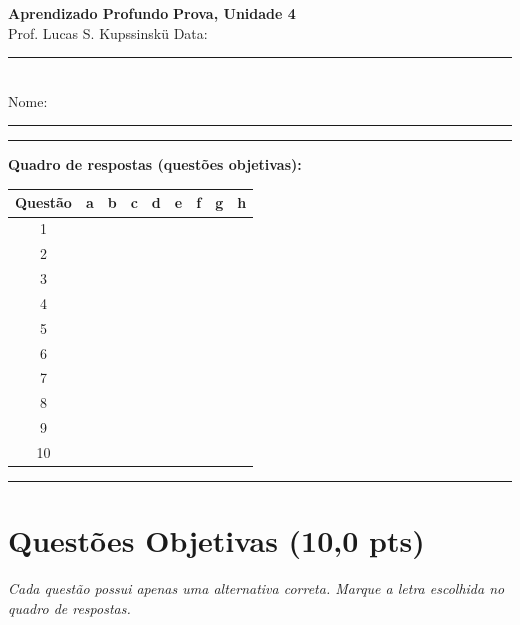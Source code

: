 \documentclass[11pt,a4paper]{article}
\begin{document}
{\Large\bfseries Aprendizado Profundo} \hfill \textbf{Prova, Unidade 4}\\
Prof. Lucas S. Kupssinskü \hfill Data: \rule{3cm}{0.4pt}\\[0.4em]
Nome: \rule{12cm}{0.4pt}

\rule{\linewidth}{0.8pt}

\textbf{Quadro de respostas (questões objetivas):}\\[0.3em]
\begin{center}
\begin{tabular}{|c|c|c|c|c|c|c|c|c|}
\hline
\textbf{Questão} & \textbf{a} & \textbf{b} & \textbf{c} & \textbf{d} & \textbf{e} & \textbf{f} & \textbf{g} & \textbf{h} \\\hline
1  & & & & & & & & \\\hline
2  & & & & & & & & \\\hline
3  & & & & & & & & \\\hline
4  & & & & & & & & \\\hline
5  & & & & & & & & \\\hline
6  & & & & & & & & \\\hline
7  & & & & & & & & \\\hline
8  & & & & & & & & \\\hline
9  & & & & & & & & \\\hline
10 & & & & & & & & \\\hline
\end{tabular}
\end{center}

\rule{\linewidth}{0.4pt}

\section*{Questões Objetivas (10{,}0 pts)}
\textit{Cada questão possui apenas uma alternativa correta. Marque a letra escolhida no quadro de respostas.}
\end{document}
